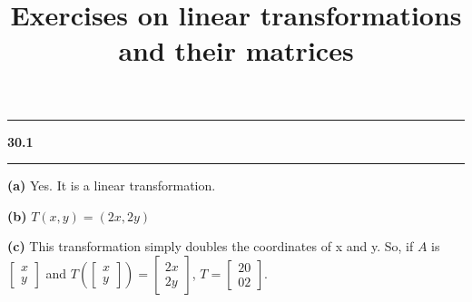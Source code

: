 \documentclass[11pt]{article}
\newcommand\question[2]{\vspace{.25in}\hrule\textbf{#1 #2}\vspace{.5em}\hrule\vspace{.10in}}
\renewcommand\part[1]{\vspace{.10in}\textbf{(#1)}}
\begin{document}
\raggedright
\newcommand\NAME{Haiying Cui}  %
\newcommand\ANDREWID{Christy}     %
\newcommand\HWNUM{30}              %

\title{Exercises on linear transformations and their matrices}
\maketitle

\question{30.1}{}
\part{a} Yes. It is a linear transformation.

\part{b} \(T(x, y) = (2x, 2y)\)

\part{c} This transformation simply doubles the coordinates of x and y. So, if \(A\) is \(\begin{bmatrix} x \\ y \end{bmatrix}\) and \(T(\begin{bmatrix} x \\ y \end{bmatrix}) = \begin{bmatrix} 2x \\ 2y \end{bmatrix}\), \(T = \begin{bmatrix} 2 0 \\ 0 2 \end{bmatrix}\).
\end{document}
